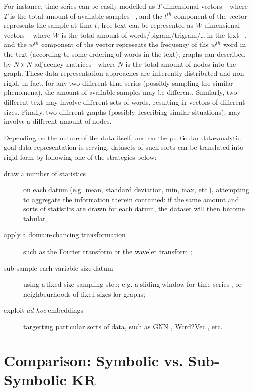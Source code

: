 \documentclass[12pt,a4paper,openright,twoside]{book}
\begin{document}
For instance, time series can be easily modelled as $T$-dimensional vectors -- where $T$ is the total amount of available samples --, and the $t^{th}$ component of the vector represents the sample at time $t$;
%
free text can be represented as $W$-dimensional vectors -- where $W$ is the total amount of words/bigram/trigram/\ldots{} in the text --, and
the $w^{th}$ component of the vector represents the frequency of the $w^{th}$ word in the text (according to some ordering of words in the text);
%
graphs can described by $N \times N$ adjacency matrices---where $N$ is the total amount of nodes into the graph.
%
These data representation approaches are inherently distributed and non-rigid.
%
In fact, for any two different time series (possibly sampling the similar phenomena), the amount of available samples may be different.
%
Similarly, two different text may involve different sets of words, resulting in vectors of different sizes.
%
Finally, two different graphs (possibly describing similar situations), may involve a different amount of nodes.

Depending on the nature of the data itself, and on the particular data-analytic goal data representation is serving, datasets of such sorts can be translated into rigid form by following one of the strategies below:
%
\begin{description}
    \item[draw a number of statistics] on each datum (e.g. mean, standard deviation, min, max, etc.), attempting to aggregate the information therein contained: if the same amount and sorts of statistics are drawn for each datum, the dataset will then become tabular;
    \item[apply a domain-chancing transformation] such as the Fourier transform \cite{CooleyLW1969} or the wavelet transform \cite{Zhang2019};
    \item[sub-sample each variable-size datum] using a fixed-size sampling step; e.g. a sliding window for time series \cite{FrankDH01}, or neighbourhoods of fixed sizes for graphs;
    \item[exploit \emph{ad-hoc} embeddings] targetting particular sorts of data, such as GNN \cite{WuPCLZY2021}, Word2Vec \cite{Church2017}, etc.
\end{description}

\section{Comparison: Symbolic vs. Sub-Symbolic KR}
\end{document}

